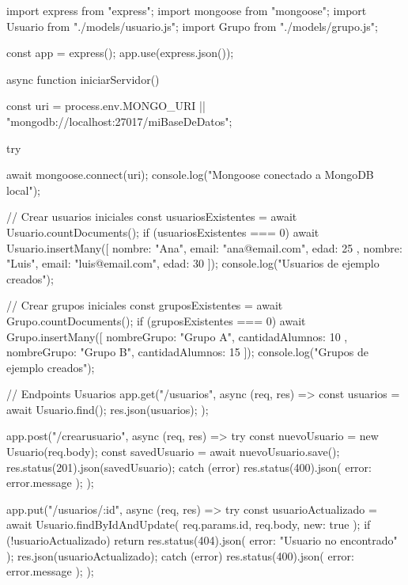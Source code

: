 \documentclass[12pt,a4paper]{article}
\begin{document}
\begin{codeblock}[language=JavaScript]
import express from "express";
import mongoose from "mongoose";
import Usuario from "./models/usuario.js";
import Grupo from "./models/grupo.js";

const app = express();
app.use(express.json());

async function iniciarServidor() {
    const uri = process.env.MONGO_URI || "mongodb://localhost:27017/miBaseDeDatos";

    try {
        await mongoose.connect(uri);
        console.log("Mongoose conectado a MongoDB local");

        // Crear usuarios iniciales
        const usuariosExistentes = await Usuario.countDocuments();
        if (usuariosExistentes === 0) {
            await Usuario.insertMany([
                { nombre: "Ana", email: "ana@email.com", edad: 25 },
                { nombre: "Luis", email: "luis@email.com", edad: 30 }
            ]);
            console.log("Usuarios de ejemplo creados");
        }

        // Crear grupos iniciales
        const gruposExistentes = await Grupo.countDocuments();
        if (gruposExistentes === 0) {
            await Grupo.insertMany([
                { nombreGrupo: "Grupo A", cantidadAlumnos: 10 },
                { nombreGrupo: "Grupo B", cantidadAlumnos: 15 }
            ]);
            console.log("Grupos de ejemplo creados");
        }

        // Endpoints Usuarios
        app.get("/usuarios", async (req, res) => {
            const usuarios = await Usuario.find();
            res.json(usuarios);
        });

        app.post("/crearusuario", async (req, res) => {
            try {
                const nuevoUsuario = new Usuario(req.body);
                const savedUsuario = await nuevoUsuario.save();
                res.status(201).json(savedUsuario);
            } catch (error) {
                res.status(400).json({ error: error.message });
            }
        });

        app.put("/usuarios/:id", async (req, res) => {
            try {
                const usuarioActualizado = await Usuario.findByIdAndUpdate(
                    req.params.id,
                    req.body,
                    { new: true }
                );
                if (!usuarioActualizado) return res.status(404).json({ error: "Usuario no encontrado" });
                res.json(usuarioActualizado);
            } catch (error) {
                res.status(400).json({ error: error.message });
            }
        });

}}
\end{codeblock}
\end{document}
